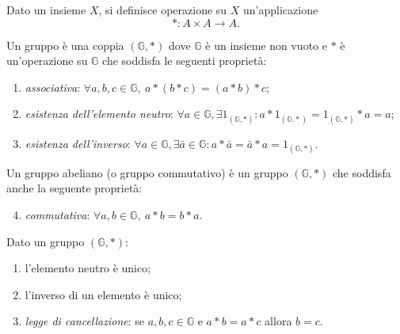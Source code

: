 
\begin{definition}[operazione]
	Dato un insieme $ X $, si definisce operazione su $ X $ un'applicazione \[* \colon A \times A \to A.\]
\end{definition}

\begin{definition}[gruppo]
	Un gruppo è una coppia $ (\mathbb{G}, *) $ dove $ \mathbb{G} $ è un insieme non vuoto e $ * $ è un'operazione su $ \mathbb{G} $ che soddisfa le seguenti proprietà:
	\begin{enumerate}[label = (\roman*)]
		\item \emph{associativa}: $ \forall a, b, c \in \mathbb{G}, \ a * (b * c) = (a * b) * c $;
		\item \emph{esistenza dell'elemento neutro}: $ \forall a \in \mathbb{G}, \exists 1_{(\mathbb{G}, *)} : a * 1_{(\mathbb{G}. *)} = 1_{(\mathbb{G}, *)} * a = a $;
		\item \emph{esistenza dell'inverso}: $ \forall a \in \mathbb{G}, \exists \bar{a} \in \mathbb{G} : a * \bar{a} = \bar{a} * a = 1_{(\mathbb{G}, *)} $.
	\end{enumerate}
\end{definition}

\begin{definition}
	Un gruppo abeliano (o gruppo commutativo) è un gruppo $ (\mathbb{G}, *) $ che soddisfa anche la seguente proprietà:
	\begin{enumerate}[label = (\roman*)]
		\setcounter{enumi}{3}
		\item \emph{commutativa}: $ \forall a, b \in \mathbb{G}, \ a * b = b * a $.
	\end{enumerate}
\end{definition}

\begin{thm}
	Dato un gruppo $ (\mathbb{G}, *) $:
	\begin{enumerate}
		\item l'elemento neutro è unico;
		\item l'inverso di un elemento è unico;
		\item \emph{legge di cancellazione}: se $ a, b, c \in \mathbb{G} $ e $ a * b = a * c $ allora $ b = c $.
	\end{enumerate}
\end{thm}


